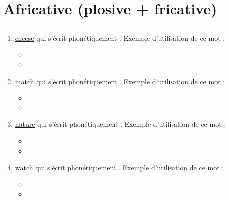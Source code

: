 \section{Africative (plosive + fricative)}\label{sec:africative}
\subsection{ }
\label{sec:orgd294ba3}
\begin{enumerate}
\item \href{http://www.wordreference.com/enfr/cheese}{cheese} qui s'écrit phonétiquement \href{https://en.oxforddictionaries.com/definition/cheese}{}. Exemple d'utilisation de
ce mot :
\begin{itemize}
\item{}
\item{}
\end{itemize}
\item \href{http://www.wordreference.com/enfr/match}{match} qui s'écrit phonétiquement \href{https://en.oxforddictionaries.com/definition/match}{}. Exemple d'utilisation de
ce mot :
\begin{itemize}
\item{}
\item{}
\end{itemize}
\item \href{http://www.wordreference.com/enfr/nature}{nature} qui s'écrit phonétiquement \href{https://en.oxforddictionaries.com/definition/nature}{}. Exemple d'utilisation
de ce mot :
\begin{itemize}
\item{}
\item{}
\end{itemize}
\item \href{http://www.wordreference.com/enfr/watch}{watch} qui s'écrit phonétiquement \href{https://en.oxforddictionaries.com/definition/watch}{}. Exemple d'utilisation de
ce mot :
\begin{itemize}
\item{}
\item{}
\end{itemize}
\end{enumerate}
